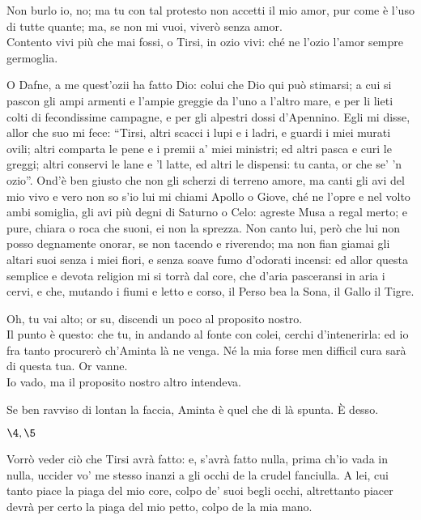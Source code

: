 \documentclass{book}
\begin{document}
	\5 Non burlo io, no; ma tu con tal protesto
	non accetti il mio amor, pur come \`e l'uso
	di tutte quante; ma, se non mi vuoi,
	viver\`o senza amor. \\

   \2 Contento vivi
	pi\`u che mai fossi, o Tirsi, in ozio vivi:
	ch\'e ne l'ozio l'amor sempre germoglia.

	\5 O Dafne, a me quest'ozii ha fatto Dio:
	colui che Dio qui pu\`o stimarsi; a cui
	si pascon gli ampi armenti e l'ampie greggie
	da l'uno a l'altro mare, e per li lieti
	colti di fecondissime campagne,
	e per gli alpestri dossi d'Apennino.
	Egli mi disse, allor che suo mi fece:
	``Tirsi, altri scacci i lupi e i ladri, e guardi
	i miei murati ovili; altri comparta
	le pene e i premii a' miei ministri; ed altri
	pasca e curi le greggi; altri conservi
	le lane e 'l latte, ed altri le dispensi:
	tu canta, or che se' 'n ozio''. Ond'\`e ben giusto
	che non gli scherzi di terreno amore,
	ma canti gli avi del mio vivo e vero
	non so s'io lui mi chiami Apollo o Giove,
	ch\'e ne l'opre e nel volto ambi somiglia,
	gli avi pi\`u degni di Saturno o Celo:
	agreste Musa a regal merto; e pure,
	chiara o roca che suoni, ei non la sprezza.
	Non canto lui, per\`o che lui non posso
	degnamente onorar, se non tacendo
	e riverendo; ma non fian giamai
	gli altari suoi senza i miei fiori, e senza
	soave fumo d'odorati incensi:
	ed allor questa semplice e devota
	religion mi si torr\`a dal core,
	che d'aria pasceransi in aria i cervi,
	e che, mutando i fiumi e letto e corso,
	il Perso bea la Sona, il Gallo il Tigre.

	\2 Oh, tu vai alto; or su, discendi un poco
	al proposito nostro. \\

   \5 Il punto \`e questo:
	che tu, in andando al fonte con colei,
	cerchi d'intenerirla: ed io fra tanto
	procurer\`o ch'Aminta l\`a ne venga.
	N\'e la mia forse men difficil cura
	sar\`a di questa tua. Or vanne. \\

   \2 Io vado,
	ma il proposito nostro altro intendeva.

	\5 Se ben ravviso di lontan la faccia,
	Aminta \`e quel che di l\`a spunta. \`E desso.


\Scena

\(\4, \5\)

	\4 Vorr\`o veder ci\`o che Tirsi avr\`a fatto:
	e, s'avr\`a fatto nulla,
	prima ch'io vada in nulla,
uccider vo' me stesso inanzi a gli occhi
	de la crudel fanciulla.
	A lei, cui tanto piace
	la piaga del mio core,
	colpo de' suoi begli occhi,
altrettanto piacer devr\`a per certo
	la piaga del mio petto,
	colpo de la mia mano.
\end{document}
